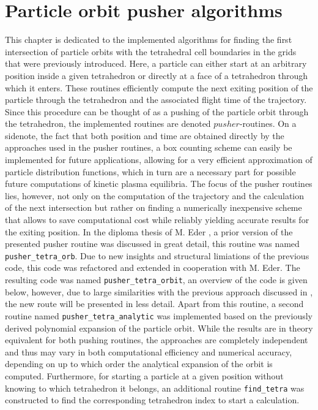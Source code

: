 \documentclass[./main.tex]{subfiles}
\begin{document}
\chapter{Particle orbit pusher algorithms}
\vspace{-0.5cm}
This chapter is dedicated to the implemented algorithms for finding the first intersection of particle orbits with the tetrahedral cell boundaries in the grids that were previously introduced. Here, a particle can either start at an arbitrary position inside a given tetrahedron or directly at a face of a tetrahedron through which it enters. These routines efficiently compute the next exiting position of the particle through the tetrahedron and the associated flight time of the trajectory. Since this procedure can be thought of as a pushing of the particle orbit through the tetrahedron, the implemented routines are denoted $pusher$-routines. On a sidenote, the fact that both position and time are obtained directly by the approaches used in the pusher routines, a box counting scheme can easily be implemented for future applications, allowing for a very efficient approximation of particle distribution functions, which in turn are a necessary part for possible future computations of kinetic plasma equilibria. The focus of the pusher routines lies, however, not only on the computation of the trajectory and the calculation of the next intersection but rather on finding a numerically inexpensive scheme that allows to save computational cost while reliably yielding accurate results for the exiting position. In the diploma thesis of M. Eder \cite{Eder_DA}, a prior version of the presented pusher routine was discussed in great detail, this routine was named \texttt{pusher\_tetra\_orb}. Due to new insights and structural limiations of the previous code, this code was refactored and extended in cooperation with M. Eder. The resulting code was named \texttt{pusher\_tetra\_orbit}, an overview of the code is given below, however, due to large similarities with the previous approach discussed in \cite{Eder_DA}, the new route will be presented in less detail. Apart from this routine, a second routine named \texttt{pusher\_tetra\_analytic} was implemented based on the previously derived polynomial expansion of the particle orbit. While the results are in theory equivalent for both pushing routines, the approaches are completely independent and thus may vary in both computational efficiency and numerical accuracy, depending on up to which order the analytical expansion of the orbit is computed. Furthermore, for starting a particle at a given position without knowing to which tetrahedron it belongs, an additional routine \texttt{find\_tetra} was constructed to find the corresponding tetrahedron index to start a calculation.
\end{document}
